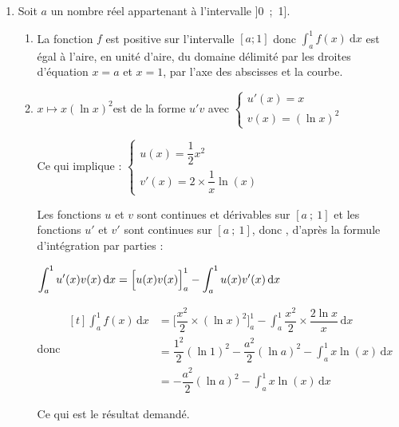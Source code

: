 \begin{enumerate}
\begin{enumerate}
Donc, d'après le théorème de la bijection, l'équation $f(x)=2$ admet une unique solution sur l'intervalle $[1~;~+\infty[$.

donc l'équation admet une unique solution  $\alpha$ sur l'intervalle $]0~;~+\infty[$.

\item À l'aide de la calculatrice, on trouve $\alpha \approx 2,46$ donc : \quad  $ 2,4 < \alpha <2,5$. 
	\end{enumerate}
\item Soit $a$ un nombre réel appartenant à l'intervalle ]0~;~1].
	\begin{enumerate}
		\item La fonction $f$ est positive sur l'intervalle $[a;1]$ donc $\displaystyle\int_a^1 f(x)\: \text{d}x$ est égal à l'aire, en unité d'aire,  du domaine délimité par les droites d'équation $x=a$ et $x=1$, par l'axe des abscisses et la courbe. 
		
		\item  $x \longmapsto x \left(\ln x \right)^2$\quad est de la forme $u' v$ avec \quad $\begin{cases}u'(x)=x\\ v(x)=(\ln x)^2 \end{cases}$

Ce qui implique : \quad $\begin{cases}u(x)=\dfrac{1}{2}x^2\\v'(x)=2 \times \dfrac{1}{x}\ln (x)\end{cases}$

Les fonctions $u$ et $v$ sont continues et dérivables sur $[a~;~1]$ et les fonctions $u'$ et $v'$ sont continues sur $[a~;~1]$, donc , d'après la formule d'intégration par parties :

$\displaystyle \int_{a}^{1} u'(x)v(x)\, \mathrm{d}x = \Big [ u(x)v(x)\strut\Big]_{a}^{1} - \int_{a}^{1} u(x)v'(x) \, \mathrm{d}x$\

donc 
$\begin{aligned}[t]
\displaystyle\int_a^1 f(x)\, \mathrm{d}x  & =\Big[ \dfrac{x^2}{2 }\times (\ln x)^2 \Big]_a^{1}-\int_a^{1} \dfrac{x^2}{2} \times \dfrac{2\ln x}{x} \, \mathrm{d}x \\
	& = \dfrac{1^2}{2} (\ln 1)^2  - \dfrac{a^2}{2} (\ln a)^2  - \int_a^{1} x \ln(x) \, \mathrm{d}x \\
	&= - \dfrac{a^2}{2} (\ln a)^2  - \int_a^{1} x \ln(x) \, \mathrm{d}x
\end{aligned}	$

Ce qui est le résultat demandé. 


\end{enumerate}
\end{enumerate}
